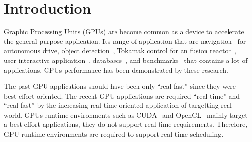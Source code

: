 \section{Introduction}
Graphic Processing Units (GPUs) are become common as a device to accelerate the general purpose application.
Its range of application that are navigation~\cite{cmu:routing} for autonomous drive, object detection~\cite{hirabayashi:cpsna2013},
Tokamak control for an fusion reactor~\cite{tokamak},
user-interactive application~\cite{kato:rtas2011}, databases~\cite{bakkum:sql}, and benchmarks~\cite{rodinia} that contains a lot of applications.
GPUs performance has been demonstrated by these research.

The past GPU applications should have been only ``real-fast'' since they were best-effort oriented.
The recent GPU applications are required ``real-time'' and ``real-fast'' by the increasing real-time oriented application of targetting real-world.
GPUs runtime environments such as CUDA~\cite{nvidia:cuda_zone} and OpenCL~\cite{opencl} 
mainly target a best-effort applications, they do not support real-time requirements.
Therefore, GPU runtime environments are required to support real-time scheduling.

